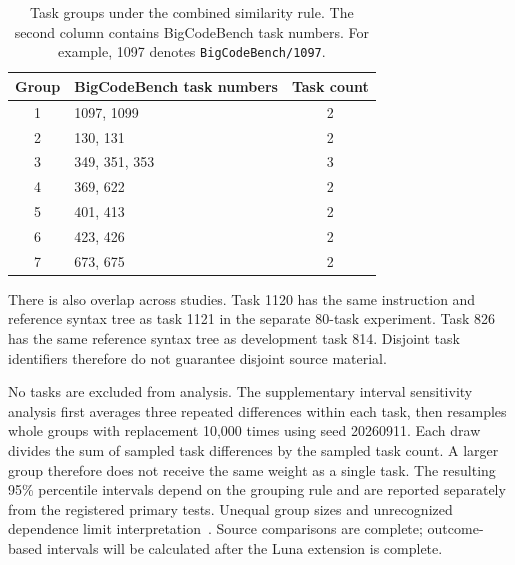 \begin{table}[htbp]\centering
\caption{Task groups under the combined similarity rule. The second column contains BigCodeBench task numbers. For example, 1097 denotes \texttt{BigCodeBench/1097}.}
\label{tab:source-groups}
\begin{tabular}{clc}\toprule
Group & BigCodeBench task numbers & Task count\\\midrule
1 & 1097, 1099 & 2\\
2 & 130, 131 & 2\\
3 & 349, 351, 353 & 3\\
4 & 369, 622 & 2\\
5 & 401, 413 & 2\\
6 & 423, 426 & 2\\
7 & 673, 675 & 2\\\bottomrule
\end{tabular}
\end{table}

There is also overlap across studies. Task 1120 has the same instruction and reference syntax tree as task 1121 in the separate 80-task experiment. Task 826 has the same reference syntax tree as development task 814. Disjoint task identifiers therefore do not guarantee disjoint source material.

No tasks are excluded from analysis. The supplementary interval sensitivity analysis first averages three repeated differences within each task, then resamples whole groups with replacement 10,000 times using seed 20260911. Each draw divides the sum of sampled task differences by the sampled task count. A larger group therefore does not receive the same weight as a single task. The resulting 95\% percentile intervals depend on the grouping rule and are reported separately from the registered primary tests. Unequal group sizes and unrecognized dependence limit interpretation~\cite{mackinnon2023clusters}. Source comparisons are complete; outcome-based intervals will be calculated after the Luna extension is complete.
